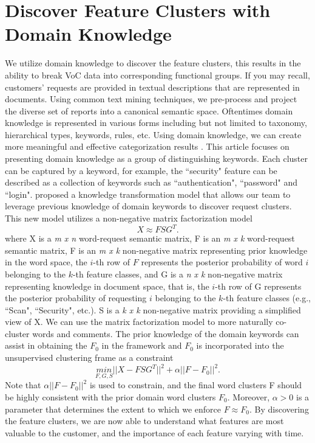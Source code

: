 \documentclass[sigconf]{acmart}
\begin{document}
\section{Discover Feature Clusters with Domain Knowledge}
We utilize domain knowledge to discover the feature clusters, this results in the ability to break VoC data into corresponding functional groups. If you may recall, customers' requests are provided in textual descriptions that are represented in documents. Using common text mining techniques, we pre-process and project the diverse set of reports into a canonical semantic space. Oftentimes domain knowledge is represented in various forms including but not limited to taxonomy, hierarchical types, keywords, rules, etc. Using domain knowledge, we can create more meaningful and effective categorization results \cite{Dayanik:2006:CIP:1148170.1148255} \cite{Liu:2004:FOS:1014052.1014130}. This article focuses on presenting domain knowledge as a group of distinguishing keywords. Each cluster can be captured by a keyword, for example, the ``security" feature can be described as a collection of keywords such as ``authentication", ``password" and ``login". \cite{Li:2008:KTW:1390334.1390368} proposed a knowledge transformation model that allows our team to leverage previous knowledge of domain keywords to discover request clusters. This new model utilizes a non-negative matrix factorization model $$X \approx FSG^T.$$ where X is a \textit{m x n} word-request semantic matrix, F is an \textit{m x k} word-request semantic matrix, F is an \textit{ m x k } non-negative matrix representing prior knowledge in the word space, the $i$-th row of $F$ represents the posterior probability of word $i$ belonging to the $k$-th feature classes, and G is a \textit{n x k} non-negative matrix representing knowledge in document space, that is, the $i$-th row of G represents the posterior probability of requesting $i$ belonging to the $k$-th feature classes (e.g., ``Scan", ``Security", etc.). S is a \textit{k x k} non-negative matrix providing a simplified view of X. We can use the matrix factorization model to more naturally co-cluster words and comments. The prior knowledge of the domain keywords can assist in obtaining the $F_0$ in the framework and $F_0$ is incorporated into the unsupervised clustering frame as a constraint $$\underset{F,G,S}{min} || X- FSG^T||^2+\alpha||F-F_0||^2.$$ Note that $\alpha||F-F_0||^2$ is used to constrain, and the final word clusters F should be highly consistent with the prior domain word clusters $F_0$. Moreover, $\alpha > 0$ is a parameter that determines the extent to which we enforce $F\approx F_0$. By discovering the feature clusters, we are now able to understand what features are most valuable to the customer, and the importance of each feature varying with time.
\end{document}
